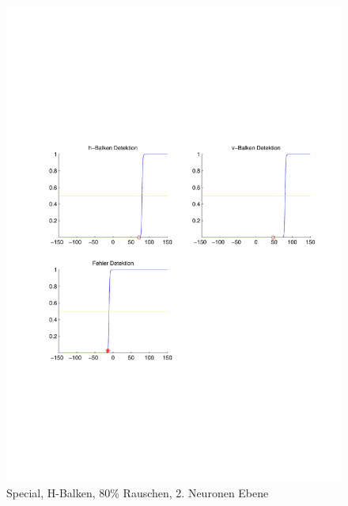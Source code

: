 \begin{figure}[hbt]
\begin{minipage}{0.8 \textwidth}
		\includegraphics[width=\textwidth]{./Bilder/Auswertung/Endergebnis/TypeSpecial_Rauschen80_H_Line_Layer2}
		\caption{Special, H-Balken, 80\% Rauschen, 2. Neuronen Ebene}
		\label{Special_H_80_2}
	\end{minipage}
\end{figure}
\clearpage


